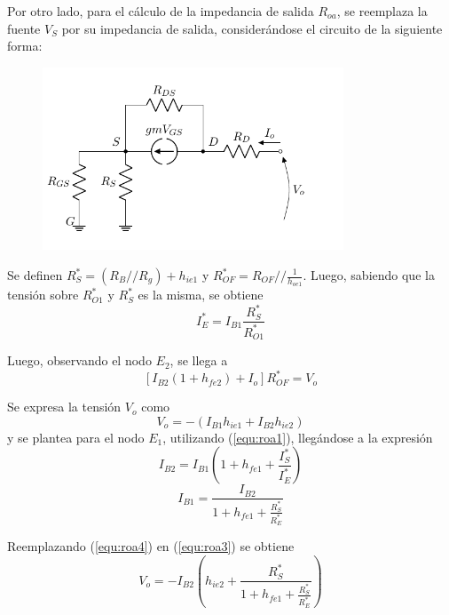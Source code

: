 Por otro lado, para el cálculo de la impedancia de salida $R_{oa}$, se reemplaza la fuente $V_S$ por su impedancia de salida, considerándose el circuito de la siguiente forma:
\begin{figure}[H]
\centering
	\includegraphics[width=0.8\textwidth, page=7]{Imagenes/ModeloIncremental.pdf}
\end{figure}
Se definen $R_{S}^* = \left( R_B // R_g \right) + h_{ie1}$ y $R_{OF}^* = R_{OF} // \frac{1}{h_{oe1}}$. Luego, sabiendo que la tensión sobre $R_{O1}^{*}$ y $R_{S}^*$ es la misma, se obtiene
\begin{equation}
	I_{E}^{*} = I_{B1} \frac{R_{S}^*}{R_{O1}^{*}}
	\label{equ:roa1}
\end{equation}

Luego, observando el nodo $E_2$, se llega a
\begin{equation}
	\left[ I_{B2} \left( 1 + h_{fe2} \right) + I_o \right] R_{OF}^* = V_o
	\label{equ:roa2}
\end{equation}

Se expresa la tensión $V_o$ como
\begin{equation}
	V_o = - \left( I_{B1} h_{ie1} + I_{B2} h_{ie2} \right)
	\label{equ:roa3}
\end{equation}
y se plantea para el nodo $E_1$, utilizando (\ref{equ:roa1}), llegándose a la expresión
\begin{equation*}
	I_{B2} = I_{B1} \left( 1 +h_{fe1} + \frac{I_{S}^{*}}{I_{E}^{*}} \right)
\end{equation*}
\begin{equation}
	I_{B1} = \frac{I_{B2}}{1 +h_{fe1} + \frac{R_{S}^{*}}{R_{E}^{*}}}
	\label{equ:roa4}
\end{equation}

Reemplazando (\ref{equ:roa4}) en (\ref{equ:roa3}) se obtiene
\begin{equation}
	V_o = - I_{B2} \left( h_{ie2} + \frac{R_{S}^{*}}{ 1 +h_{fe1} + \frac{R_{S}^{*}}{R_{E}^{*}}} \right)
	\label{equ:roa5}
\end{equation}

